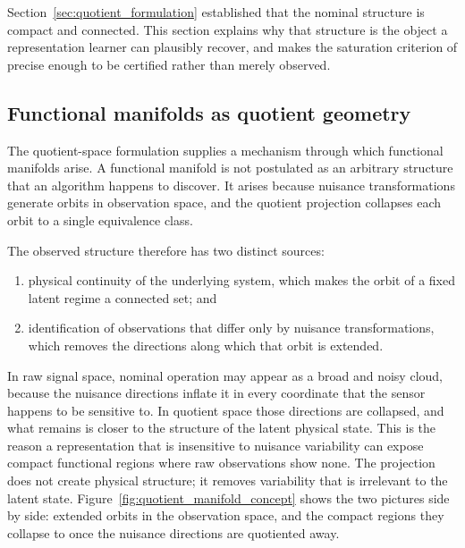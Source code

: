 \documentclass[a4paper]{cas-sc}
\begin{document}
Section~\ref{sec:quotient_formulation} established that the nominal structure
is compact and connected. This section explains why that structure is the
object a representation learner can plausibly recover, and makes the
saturation criterion of \citet{disanti2026inverse} precise enough to be
certified rather than merely observed.

\subsection{Functional manifolds as quotient geometry}
\label{subsec:quotient_geometry}

The quotient-space formulation supplies a mechanism through which functional
manifolds arise. A functional manifold is not postulated as an arbitrary
structure that an algorithm happens to discover. It arises because nuisance
transformations generate orbits in observation space, and the quotient
projection collapses each orbit to a single equivalence class.

The observed structure therefore has two distinct sources:

\begin{enumerate}[label=(\roman*),leftmargin=1.8em]
    \item physical continuity of the underlying system, which makes the orbit
          of a fixed latent regime a connected set; and
    \item identification of observations that differ only by nuisance
          transformations, which removes the directions along which that orbit
          is extended.
\end{enumerate}

In raw signal space, nominal operation may appear as a broad and noisy cloud,
because the nuisance directions inflate it in every coordinate that the sensor
happens to be sensitive to. In quotient space those directions are collapsed,
and what remains is closer to the structure of the latent physical state. This
is the reason a representation that is insensitive to nuisance variability can
expose compact functional regions where raw observations show none. The
projection does not create physical structure; it removes variability that is
irrelevant to the latent state.
Figure~\ref{fig:quotient_manifold_concept} shows the two pictures side by
side: extended orbits in the observation space, and the compact regions they
collapse to once the nuisance directions are quotiented away.
\end{document}
